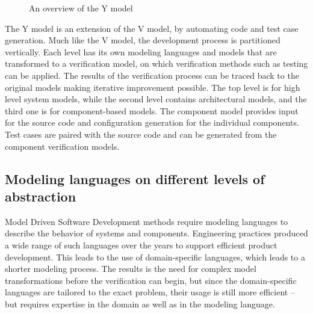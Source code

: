 \begin{figure}
	\caption{An overview of the Y model}
	\label{fig:intro:ymodel}
\end{figure}

The Y model\citep{ymodel} is an extension of the V model\citep{randomwikipedialink3}, by automating code and test case generation. Much like the V model, the development process is partitioned vertically. Each level has its own modeling languages and models that are transformed to a verification model, on which verification methods such as testing can be applied. The results of the verification process can be traced back to the original models making iterative improvement possible. The top level is for high level system models, while the second level contains architectural models, and the third one is for component-based models. The component model provides input for the source code and configuration generation for the individual components. Test cases are paired with the source code and can be generated from the component verification models.


\subsection{Modeling languages on different levels of abstraction}

Model Driven Software Development methods require modeling languages to describe the behavior of systems and components. Engineering practices produced a wide range of such languages over the years to support efficient product development. This leads to the use of domain-specific languages, which leads to a shorter modeling process. The results is the need for complex model transformations before the verification can begin,
but since the domain-specific languages are tailored to the exact problem, their usage is still more efficient -- but requires expertise in the domain as well as in the modeling language.  

